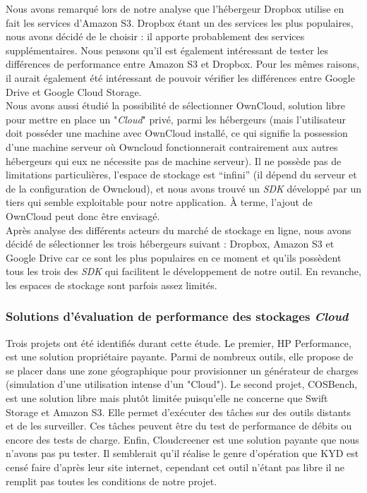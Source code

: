\documentclass[10pt]{article}
\begin{document}
Nous avons remarqué lors de notre analyse que l’hébergeur Dropbox
utilise en fait les services d'Amazon S3. Dropbox étant un des
services les plus populaires, nous avons décidé de le choisir : il apporte probablement des services supplémentaires. Nous pensons qu’il est également intéressant de tester les différences de
performance entre Amazon S3 et Dropbox. Pour les mêmes raisons, il aurait
également été intéressant de pouvoir vérifier les différences entre
Google Drive et Google Cloud Storage.\\

Nous avons aussi étudié la possibilité de sélectionner OwnCloud, solution libre pour mettre en place un "\textit{Cloud}" privé, parmi les hébergeurs (mais l’utilisateur doit posséder une machine avec OwnCloud installé, ce qui signifie la possession d'une machine serveur où Owncloud fonctionnerait contrairement aux autres hébergeurs qui eux ne nécessite pas de machine serveur). Il ne possède pas de limitations particulières, l’espace de stockage est “infini” (il dépend du serveur et de la configuration de Owncloud), et nous avons trouvé un \textit{SDK} développé par un tiers qui semble exploitable pour notre application. À terme, l’ajout de OwnCloud peut donc être envisagé.\\
Après analyse des différents acteurs du marché de stockage en ligne, nous avons décidé de sélectionner les trois hébergeurs suivant : Dropbox, Amazon S3 et Google Drive car ce sont les plus populaires en ce moment et qu'ils possèdent tous les trois des \textit{SDK} qui facilitent le développement de notre outil. En revanche, les espaces de stockage sont parfois assez limités.

\subsubsection{Solutions d'évaluation de performance des stockages \textit{Cloud}}

Trois projets ont été identifiés durant cette étude. Le premier, HP Performance, est une solution propriétaire payante. Parmi de nombreux outils, elle propose de se placer dans une zone géographique pour provisionner un générateur de charges (simulation d'une utilisation intense d'un "Cloud"). Le second projet, COSBench, est une solution libre mais plutôt limitée puisqu’elle ne concerne que Swift Storage et Amazon S3. Elle permet d'exécuter des tâches sur des outils distants et de les surveiller. Ces tâches peuvent être du test de performance de débits ou encore des tests de charge. Enfin, Cloudcreener est une solution payante que nous n’avons pas pu tester. Il semblerait qu'il réalise le genre d'opération que KYD est censé faire d'après leur site internet, cependant cet outil n'étant pas libre il ne remplit pas toutes les conditions de notre projet.
\end{document}
